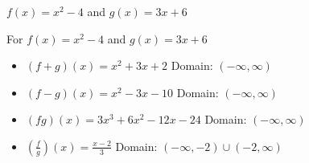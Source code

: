 {$f(x) = x^2-4$ and $g(x) = 3x+6$}
{For $f(x) = x^2-4$ and $g(x) = 3x+6$

\begin{itemize}
\item $(f+g)(x) = x^2+3x+2$
      Domain: $(-\infty, \infty)$
\item $(f-g)(x) = x^2-3x-10$
      Domain:  $(-\infty, \infty)$
\item $(fg)(x) = 3x^3+6x^2-12x-24$
      Domain: $(-\infty, \infty)$
\item $\left(\frac{f}{g}\right)(x) = \frac{x-2}{3}$
      Domain:  $\left(-\infty, -2 \right) \cup \left(-2, \infty \right)$
\end{itemize}
}